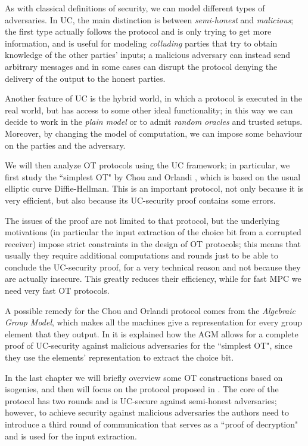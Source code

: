 As with classical definitions of security, we can model different types of adversaries. In UC, the main distinction is between \emph{semi-honest} and \emph{malicious}; the first type actually follows the protocol and is only trying to get more information, and is useful for modeling \emph{colluding} parties that try to obtain knowledge of the other parties' inputs; a malicious adversary can instead send arbitrary messages and in some cases can disrupt the protocol denying the delivery of the output to the honest parties.

Another feature of UC is the hybrid world, in which a protocol is executed in the real world, but has access to some other ideal functionality; in this way we can decide to work in the \emph{plain model} or to admit \emph{random oracles} and trusted setups. Moreover, by changing the model of computation, we can impose some behaviour on the parties and the adversary.

We will then analyze OT protocols using the UC framework; in particular, we first study the ``simplest OT" by Chou and Orlandi \cite{Chou_Orlandi}, which is based on the usual elliptic curve Diffie-Hellman. This is an important protocol, not only because it is very efficient, but also because its UC-security proof contains some errors.

The issues of the proof are not limited to that protocol, but the underlying motivations (in particular the input extraction of the choice bit from a corrupted receiver) impose strict constraints in the design of OT protocols; this means that usually they require additional computations and rounds just to be able to conclude the UC-security proof, for a very technical reason and not because they are actually insecure. This greatly reduces their efficiency, while for fast MPC we need very fast OT protocols.

A possible remedy for the Chou and Orlandi protocol comes from the \emph{Algebraic Group Model}, which makes all the machines give a representation for every group element that they output. In \cite{AGM_UC} it is explained how the AGM allows for a complete proof of UC-security against malicious adversaries for the ``simplest OT", since they use the elements' representation to extract the choice bit.

In the last chapter we will briefly overview some OT constructions based on isogenies, and then will focus on the protocol proposed in \cite{Lai_twists}. The core of the protocol has two rounds and is UC-secure against semi-honest adversaries; however, to achieve security against malicious adversaries the authors need to introduce a third round of communication that serves as a ``proof of decryption" and is used for the input extraction.

